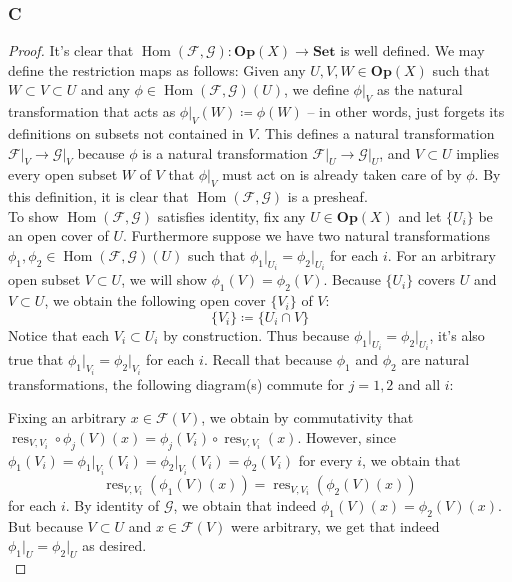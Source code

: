 \documentclass{article}
\newcommand{\fF}{\mathscr{F}}
\newcommand{\fG}{\mathscr{G}}
\DeclareMathOperator{\res}{res}
\DeclareMathOperator{\Hom}{Hom}
\newcommand{\Set}{\mathbf{Set}} %
\newcommand{\Op}{\mathbf{Op}} %
\begin{document}
\subsubsection{C}\label{2.3.C}
\begin{proof}
    It's clear that $\Hom(\fF,\fG):\Op(X)\to \Set$ is well defined. We may define the restriction maps as follows: Given any $U,V,W\in \Op(X)$ such that $W\subset V\subset U$ and any $\phi\in \Hom(\fF,\fG)(U)$, we define $\phi\vert_{V}$ as the natural transformation that acts as $\phi\vert_{V}(W)\coloneqq \phi(W)$ -- in other words, just forgets its definitions on subsets not contained in $V$. This defines a natural transformation $\fF\vert_{V}\to \fG\vert_{V}$ because $\phi$ is a natural transformation $\fF\vert_{U}\to \fG\vert_{U}$, and $V\subset U$ implies every open subset $W$ of $V$ that $\phi\vert_{V}$ must act on is already taken care of by $\phi$. By this definition, it is clear that $\Hom(\fF,\fG)$ is a presheaf.\\
    \indent To show $\Hom(\fF,\fG)$ satisfies identity, fix any $U\in \Op(X)$ and let $\{U_i\}$ be an open cover of $U$. Furthermore suppose we have two natural transformations $\phi_1,\phi_2\in \Hom(\fF,\fG)(U)$ such that $\phi_1\vert_{U_i}=\phi_2\vert_{U_i}$ for each $i$. For an arbitrary open subset $V\subset U$, we will show $\phi_1(V)=\phi_2(V)$. Because $\{U_i\}$ covers $U$ and $V\subset U$, we obtain the following open cover $\{V_i\}$ of $V$:
    \[
    \{V_i\}\coloneqq \{U_i\cap V\}
    \]
    Notice that each $V_i\subset U_i$ by construction. Thus because $\phi_1\vert_{U_i}=\phi_2\vert_{U_i}$, it's also true that $\phi_1\vert_{V_i}=\phi_2\vert_{V_i}$ for each $i$. Recall that because $\phi_1$ and $\phi_2$ are natural transformations, the following diagram(s) commute for $j=1,2$ and all $i$:
    \begin{center}
    \end{center}
    Fixing an arbitrary $x\in \fF(V)$, we obtain by commutativity that $\res_{V,V_i}\circ \phi_j(V)(x)=\phi_j(V_i)\circ \res_{V,V_i}(x)$. However, since $\phi_1(V_i)=\phi_1\vert_{V_i}(V_i)=\phi_2\vert_{V_i}(V_i)=\phi_2(V_i)$ for every $i$, we obtain that 
    \[
    \res_{V,V_i}( \phi_1(V)(x))=\res_{V,V_i}(\phi_2(V)(x))
    \]
    for each $i$. By identity of $\fG$, we obtain that indeed $\phi_1(V)(x)=\phi_2(V)(x)$. But because $V\subset U$ and $x\in \fF(V)$ were arbitrary, we get that indeed $\phi_1\vert_{U}=\phi_2\vert_{U}$ as desired.\\

\end{proof}
\end{document}
